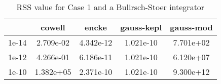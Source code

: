 \begin{table}
\centering
\begin{tabular}{|c|c|c|c|c|}
\hline
 & cowell & encke & gauss-kepl & gauss-mod \\
\hline
1e-14 & 2.709e-02 & 4.342e-12 & 1.021e-10 & 7.701e+02 \\
\hline
1e-12 & 4.266e-01 & 6.186e-11 & 1.021e-10 & 6.120e+07 \\
\hline
1e-10 & 1.382e+05 & 2.371e-10 & 1.021e-10 & 9.300e+12 \\
\hline
\end{tabular}
\caption{RSS value for Case 1 and a Bulirsch-Stoer integrator}
\label{table:tab:keplerapprox_rss_C1_Bulirsch-Stoer}
\end{table}
